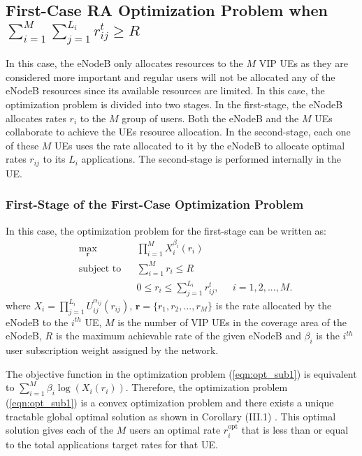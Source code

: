 \documentclass[journal]{IEEEtran} 				\IEEEoverridecommandlockouts 						\usepackage{amsmath,amssymb}
\begin{document}
\subsection{First-Case RA Optimization Problem when $\sum_{i=1}^{M}\sum_{j=1}^{L_i}r_{ij}^t\geq R$} \label{First-Case-RA}
In this case, the eNodeB only allocates resources to the $M$ VIP UEs as they are considered more important and regular users will not be allocated any of the eNodeB resources since its available resources are limited. In this case, the optimization problem is divided into two stages. In the first-stage, the eNodeB allocates rates $r_i$ to the $M$ group of users. Both the eNodeB and the $M$ UEs collaborate to achieve the UEs resource allocation. In the second-stage, each one of these $M$ UEs uses the rate allocated to it by the eNodeB to allocate optimal rates $r_{ij}$ to its  $L_i$ applications. The second-stage is performed internally in the UE.
\subsubsection{First-Stage of the First-Case Optimization Problem}\label{FC-FS-RA}
In this case, the optimization problem for the first-stage can be written as:
\begin{equation}\label{eqn:opt_sub1}
\begin{aligned}
& \underset{\textbf{r}}{\text{max}}
& & \prod_{i=1}^{M}X_i^{\beta_{i}}(r_i) \\
& \text{subject to}
& & \sum_{i=1}^{M}r_i \leq R\\
& & & 0 \leq  r_i \leq \sum_{j=1}^{L_i}r_{ij}^t, \;\;\;\;\; i = 1,2, ...,M.
\end{aligned}
\end{equation}
where $X_i=\prod_{j=1}^{L_i}U_{ij}^{\alpha_{ij}}(r_{ij})$, $\textbf{r} =\{r_1,r_2,...,r_M\}$ is the rate allocated by the eNodeB to the $i^{th}$ UE, $M$ is the number of VIP UEs in the coverage area of the eNodeB, $R$ is the maximum achievable rate of the given eNodeB and $\beta_i$ is the $i^{th}$ user subscription weight assigned by the network.

The objective function in the optimization problem (\ref{eqn:opt_sub1}) is equivalent to $\sum_{i=1}^{M}\beta_i \log(X_i(r_i))$. Therefore, the optimization problem (\ref{eqn:opt_sub1}) is a convex optimization problem and there exists a unique tractable global optimal solution as shown in Corollary (III.1) \cite{Ahmed_Utility3}. This optimal solution gives each of the $M$ users an optimal rate $r_i^{\text{opt}}$ that is  less than or equal to the total applications target rates for that UE.
\end{document}
